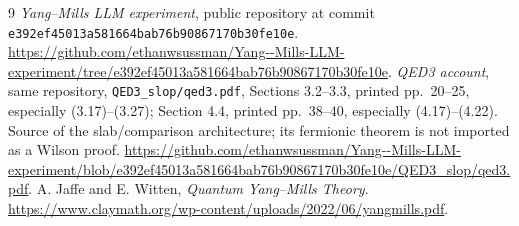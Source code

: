 \documentclass[11pt]{article}
\theoremstyle{remark}
\begin{document}
\begin{thebibliography}{9}
\emph{Yang--Mills LLM experiment}, public repository at
commit \texttt{e392ef45013a581664bab76b90867170b30fe10e}.
\url{https://github.com/ethanwsussman/Yang--Mills-LLM-experiment/tree/e392ef45013a581664bab76b90867170b30fe10e}.
\emph{QED3 account}, same repository,
\texttt{QED3\_slop/qed3.pdf}, Sections 3.2--3.3, printed pp.~20--25,
especially (3.17)--(3.27); Section 4.4, printed pp.~38--40,
especially (4.17)--(4.22). Source of the slab/comparison architecture;
its fermionic theorem is not imported as a Wilson proof.
\url{https://github.com/ethanwsussman/Yang--Mills-LLM-experiment/blob/e392ef45013a581664bab76b90867170b30fe10e/QED3_slop/qed3.pdf}.
A. Jaffe and E. Witten, \emph{Quantum Yang--Mills Theory}.
\url{https://www.claymath.org/wp-content/uploads/2022/06/yangmills.pdf}.
\end{thebibliography}
\end{document}
